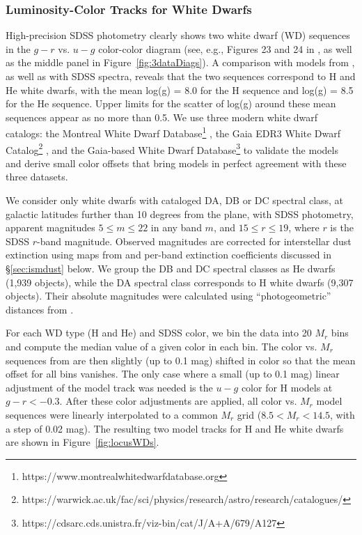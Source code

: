 \subsubsection{Luminosity-Color Tracks for White Dwarfs}

High-precision SDSS photometry clearly shows two white dwarf (WD) sequences in the $g-r$ vs. $u-g$ color-color diagram
(see, e.g., Figures 23 and 24 in \citealt{2007AJ....134..973I}, as well as the middle panel in Figure~\ref{fig:3dataDiags}).
A comparison with models from \cite{1995PASP..107.1047B}, as well as with SDSS spectra, reveals that the two sequences
correspond to H and He white dwarfs, with the mean log(g) = 8.0 for the H sequence and log(g) = 8.5 for the He sequence.
Upper limits for the scatter of log(g) around these mean sequences appear as no more than 0.5. 
We use three modern white dwarf catalogs: the Montreal White Dwarf
Database\footnote{https://www.montrealwhitedwarfdatabase.org} \citep{2017ASPC..509....3D}, the Gaia EDR3 White Dwarf Catalog\footnote{https://warwick.ac.uk/fac/sci/physics/research/astro/research/catalogues/} \citep{2021MNRAS.508.3877G}, 
and the Gaia-based White Dwarf Database\footnote{https://cdsarc.cds.unistra.fr/viz-bin/cat/J/A+A/679/A127} \citep{2023A&A...679A.127G}
to validate the \cite{1995PASP..107.1047B} models and derive small color offsets that bring models in perfect agreement with these three datasets.

We consider only white dwarfs with cataloged DA, DB or DC spectral class, at galactic latitudes further than 10 degrees from the plane,
with SDSS photometry, apparent magnitudes $5 \le m \le 22$ in any band $m$, and $15 \le r \le 19$, where $r$ is the SDSS $r$-band magnitude.
Observed magnitudes are corrected for interstellar dust extinction using maps from \cite{schlegel_maps_1998} and per-band extinction coefficients
discussed in \S\ref{sec:ismdust} below. We group the DB and DC spectral classes as He dwarfs (1,939 objects), while the DA spectral class corresponds
to H white dwarfs (9,307 objects). Their absolute magnitudes were calculated using ``photogeometric'' distances from \cite{bailer-jones_estimating_2021}. 

For each WD type (H and He) and SDSS color, we bin the data into 20 $M_r$ bins and compute the median value of a given color in each bin.
The color vs. $M_r$ sequences from \cite{1995PASP..107.1047B} are then slightly (up to 0.1 mag) shifted in color so that the mean offset for all bins
vanishes. The only case where a small (up to 0.1 mag) linear adjustment of the model track was needed is the $u-g$ color for H models at $g-r<-0.3$. 
After these color adjustments are applied, all color vs. $M_r$ model sequences were linearly interpolated to a common $M_r$ grid ($8.5 < M_r < 14.5$,
with a step of 0.02 mag). The resulting two model tracks for H and He white dwarfs are shown in Figure~\ref{fig:locusWDs}. 
   

